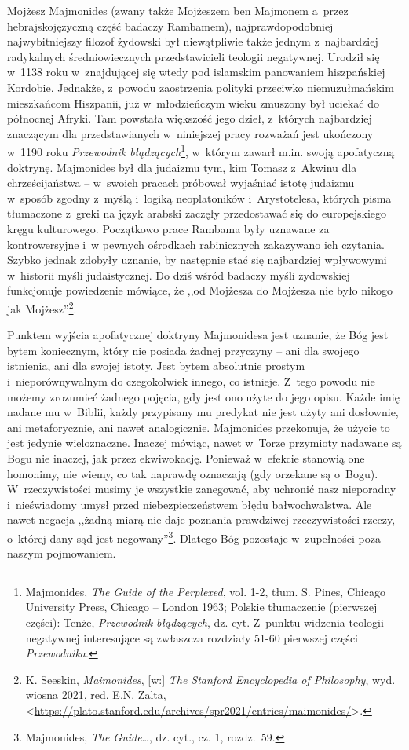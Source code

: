 Mojżesz Majmonides (zwany także Mojżeszem ben Majmonem a~przez hebrajskojęzyczną część badaczy Rambamem), najprawdopodobniej najwybitniejszy filozof żydowski był niewątpliwie także jednym z~najbardziej radykalnych średniowiecznych przedstawicieli teologii negatywnej. Urodził się w~1138 roku w~znajdującej się wtedy pod islamskim panowaniem hiszpańskiej Kordobie. Jednakże, z~powodu zaostrzenia polityki przeciwko niemuzułmańskim mieszkańcom Hiszpanii, już w~młodzieńczym wieku zmuszony był uciekać do północnej Afryki. Tam powstała większość jego dzieł, z~których najbardziej znaczącym dla przedstawianych w~niniejszej pracy rozważań jest ukończony w~1190 roku \textit{Przewodnik błądzących}\footnote{Majmonides, \textit{The Guide of the Perplexed}, vol. 1-2, tłum. S. Pines, Chicago University Press, Chicago -- London 1963; Polskie tłumaczenie (pierwszej części): Tenże, \textit{Przewodnik błądzących}, dz. cyt. Z~punktu widzenia teologii negatywnej interesujące są zwłaszcza rozdziały 51-60 pierwszej części \textit{Przewodnika}.}, w~którym zawarł m.in. swoją apofatyczną doktrynę. Majmonides był dla judaizmu tym, kim Tomasz z~Akwinu dla chrześcijaństwa -- w~swoich pracach próbował wyjaśniać istotę judaizmu w~sposób zgodny z~myślą i~logiką neoplatoników i~Arystotelesa, których pisma tłumaczone z~greki na język arabski zaczęły przedostawać się do europejskiego kręgu kulturowego. Początkowo prace Rambama były uznawane za kontrowersyjne i~w pewnych ośrodkach rabinicznych zakazywano ich czytania. Szybko jednak zdobyły uznanie, by następnie stać się najbardziej wpływowymi w~historii myśli judaistycznej. Do dziś wśród badaczy myśli żydowskiej funkcjonuje powiedzenie mówiące, że ,,od Mojżesza do Mojżesza nie było nikogo jak Mojżesz''\footnote{K. Seeskin, \textit{Maimonides}, [w:] \textit{The Stanford Encyclopedia of Philosophy}, wyd. wiosna 2021, red. E.N. Zalta, <\url{https://plato.stanford.edu/archives/spr2021/entries/maimonides/}>.}.

Punktem wyjścia apofatycznej doktryny Majmonidesa jest uznanie, że Bóg jest bytem koniecznym, który nie posiada żadnej przyczyny -- ani dla swojego istnienia, ani dla swojej istoty. Jest bytem absolutnie prostym i~nieporównywalnym do czegokolwiek innego, co istnieje. Z~tego powodu nie możemy zrozumieć żadnego pojęcia, gdy jest ono użyte do jego opisu. Każde imię nadane mu w~Biblii, każdy przypisany mu predykat nie jest użyty ani dosłownie, ani metaforycznie, ani nawet analogicznie. Majmonides przekonuje, że użycie to jest jedynie wieloznaczne. Inaczej mówiąc, nawet w~Torze przymioty nadawane są Bogu nie inaczej, jak przez ekwiwokację. Ponieważ w~efekcie stanowią one homonimy, nie wiemy, co tak naprawdę oznaczają (gdy orzekane są o~Bogu). W~rzeczywistości musimy je wszystkie zanegować, aby uchronić nasz nieporadny i~nieświadomy umysł przed niebezpieczeństwem błędu bałwochwalstwa. Ale nawet negacja ,,żadną miarą nie daje poznania prawdziwej rzeczywistości rzeczy, o~której dany sąd jest negowany''\footnote{Majmonides, \textit{The Guide}…, dz. cyt., cz. 1, rozdz.~59.}. Dlatego Bóg pozostaje w~zupełności poza naszym pojmowaniem.

